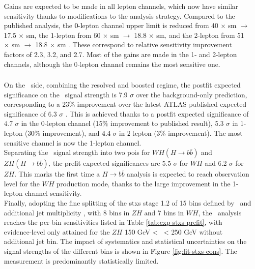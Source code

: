 Gains are expected to be made in all lepton channels, which now have similar sensitivity thanks to modifications to the analysis strategy. Compared to the published analysis, the 0-lepton channel upper limit is reduced from 40 $\times$ \gls{sm} $\rightarrow$ 17.5 $\times$ \gls{sm}, the 1-lepton from 60 $\times$ \gls{sm} $\rightarrow$ 18.8 $\times$ \gls{sm}, and the 2-lepton from 51 $\times$ \gls{sm} $\rightarrow$ 18.8 $\times$ \gls{sm} \cite{Collaboration:2721696}. These correspond to relative sensitivity improvement factors of 2.3, 3.2, and 2.7. Most of the gains are made in the 1- and 2-lepton channels, although the 0-lepton channel remains the most sensitive one.

\subsubsection{\boldvhb}
On the \vhb\ side, combining the resolved and boosted regime, the postfit expected significance on the \vhb\ signal strength is 7.9 $\sigma$ over the background-only prediction, corresponding to a 23\% improvement over the latest ATLAS published expected significance of 6.3 $\sigma$ \cite{ATLAS:2021wqh}. This is achieved thanks to a postfit expected significance of 4.7 $\sigma$ in the 0-lepton channel (15\% improvement to published result), 5.3 $\sigma$ in 1-lepton (30\% improvement), and 4.4 $\sigma$ in 2-lepton (3\% improvement). The most sensitive channel is now the 1-lepton channel. \\

Separating the \vhb\ signal strength into two \glspl{poi} for $WH(H \rightarrow{b\bar{b}})$ and $ZH(H \rightarrow{b\bar{b}})$, the prefit expected significances are 5.5 $\sigma$ for $WH$ and 6.2 $\sigma$ for $ZH$. This marks the first time a $H \rightarrow b\bar{b}$ analysis is expected to reach observation level for the $WH$ production mode, thanks to the large improvement in the 1-lepton channel sensitivity. \\

Finally, adopting the fine splitting of the \gls{stxs} stage 1.2 of 15 bins defined by \ptv\ and additional jet multiplicity \nj, with 8 bins in $ZH$ and 7 bins in $WH$, the \vhb\ analysis reaches the per-bin sensitivities listed in Table \ref{tab:exp-stxs-prefit}, with evidence-level only attained for the $ZH$ 150 GeV < \ptv\ < 250 GeV without additional jet bin. The impact of systematics and statistical uncertainties on the signal strengths of the different bins is shown in Figure \ref{fig:fit-stxs-cons}. The measurement is predominantly statistically limited. 

